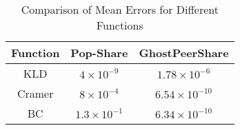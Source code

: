 

\begin{table}[h!]
\centering
\begin{tabular}{|c|c|c|}
\hline
\textbf{Function} & \textbf{Pop-Share} & \textbf{GhostPeerShare} \\
\hline
KLD     & $4 \times 10^{-9}$ & $1.78 \times 10^{-6}$ \\
Cramer  & $8 \times 10^{-4}$ & $6.54 \times 10^{-10}$ \\
BC      & $1.3 \times 10^{-1}$ & $6.34 \times 10^{-10}$ \\
\hline
\end{tabular}
\caption{Comparison of Mean Errors for Different Functions}
\end{table}
